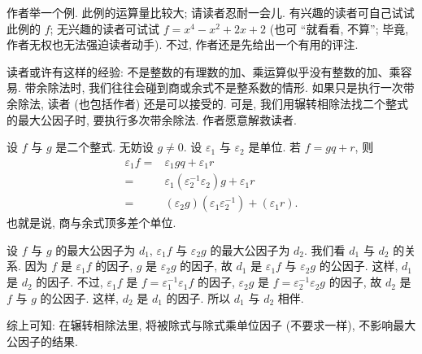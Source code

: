 作者举一个例. 此例的运算量比较大; 请读者忍耐一会儿. 有兴趣的读者可自己试试此例的 $f$; 无兴趣的读者可试试 $f = x^4-x^2+2 x+2$ (也可 ``就看看, 不算''; 毕竟, 作者无权也无法强迫读者动手). 不过, 作者还是先给出一个有用的评注.

\begin{remark}
    读者或许有这样的经验: 不是整数的有理数的加、乘运算似乎没有整数的加、乘容易. 带余除法时, 我们往往会碰到商或余式不是整系数的情形. 如果只是执行一次带余除法, 读者 (也包括作者) 还是可以接受的. 可是, 我们用辗转相除法找二个整式的最大公因子时, 要执行多次带余除法. 作者愿意解救读者.

    设 $f$ 与 $g$ 是二个整式. 无妨设 $g \neq 0$. 设 $\varepsilon_1$ 与 $\varepsilon_2$ 是单位. 若 $f = gq + r$, 则
    \begin{align*}
        \varepsilon_1 f
        = {} & \varepsilon_1 gq + \varepsilon_1 r                                        \\
        = {} & \varepsilon_1 (\varepsilon_2^{-1} \varepsilon_2) g + \varepsilon_1 r      \\
        = {} & (\varepsilon_2 g) (\varepsilon_1 \varepsilon_2^{-1}) + (\varepsilon_1 r).
    \end{align*}
    也就是说, 商与余式顶多差个单位.

    设 $f$ 与 $g$ 的最大公因子为 $d_1$, $\varepsilon_1 f$ 与 $\varepsilon_2 g$ 的最大公因子为 $d_2$. 我们看 $d_1$ 与 $d_2$ 的关系. 因为 $f$ 是 $\varepsilon_1 f$ 的因子, $g$ 是 $\varepsilon_2 g$ 的因子, 故 $d_1$ 是 $\varepsilon_1 f$ 与 $\varepsilon_2 g$ 的公因子. 这样, $d_1$ 是 $d_2$ 的因子. 不过, $\varepsilon_1 f$ 是 $f = \varepsilon_1^{-1} \varepsilon_1 f$ 的因子, $\varepsilon_2 g$ 是 $f = \varepsilon_2^{-1} \varepsilon_2 g$ 的因子, 故 $d_2$ 是 $f$ 与 $g$ 的公因子. 这样, $d_2$ 是 $d_1$ 的因子. 所以 $d_1$ 与 $d_2$ 相伴.

    综上可知: 在辗转相除法里, 将被除式与除式乘单位因子 (不要求一样), 不影响最大公因子的结果.
\end{remark}

